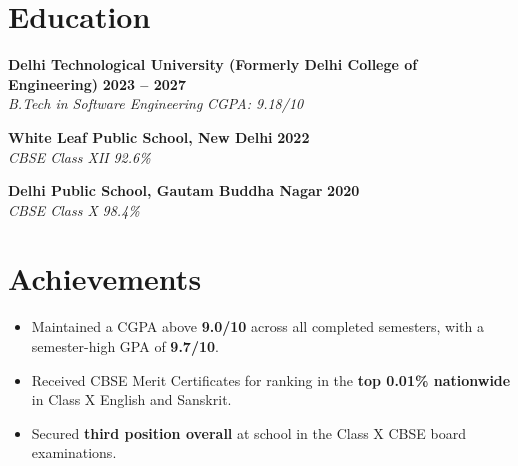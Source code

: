 \documentclass[a4paper,10pt]{article}
\newcommand{\resumeHeading}[4]{
  \textbf{#1} \hfill \textbf{#2}\\
  \textit{#3} \hfill \textit{#4}\\[-3pt]
}
\begin{document}

\section{Education}

\resumeHeading
  {Delhi Technological University (Formerly Delhi College of Engineering)}
  {2023 -- 2027}
  {B.Tech in Software Engineering}
  {CGPA: 9.18/10}

\vspace{3pt}

\resumeHeading
  {White Leaf Public School, New Delhi}
  {2022}
  {CBSE Class XII}
  {92.6\%}

\vspace{3pt}

\resumeHeading
  {Delhi Public School, Gautam Buddha Nagar}
  {2020}
  {CBSE Class X}
  {98.4\%}


\section{Achievements}

\begin{itemize}
  \item Maintained a CGPA above \textbf{9.0/10} across all completed semesters,
  with a semester-high GPA of \textbf{9.7/10}.

  \item Received CBSE Merit Certificates for ranking in the
  \textbf{top 0.01\% nationwide} in Class X English and Sanskrit.

  \item Secured \textbf{third position overall} at school in the Class X CBSE
  board examinations.
\end{itemize}
\end{document}
